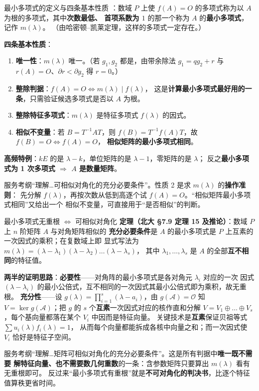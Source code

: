 \begin{fdeep}{最小多项式的定义与四条基本性质}
：数域 $P$ 上使 $f(A)=O$ 的多项式称为以 $A$ 为根的多项式，其中\textbf{次数最低、
首项系数为 $1$} 的那一个称为 $A$ 的\textbf{最小多项式}，记作 $m(\lambda)$。
（由哈密顿--凯莱定理，这样的多项式一定存在。）

\textbf{四条基本性质}：
\begin{enumerate}[leftmargin=2.2em,itemsep=0.2em]
\item \textbf{唯一性}：$m(\lambda)$ 唯一。（若 $g_1,g_2$ 都是，由带余除法 $g_1=qg_2+r$ 与
      $r(A)=O$、$\partial r<\partial g_2$ 得 $r=0$。）
\item \textbf{整除判据}：$f(A)=O\iff m(\lambda)\mid f(\lambda)$，
      这是\textbf{计算最小多项式最好用的一条}，只需验证候选多项式是否以 $A$ 为根。
\item \textbf{整除特征多项式}：$m(\lambda)$ 是特征多项式 $f(\lambda)$ 的因式。
\item \textbf{相似不变量}：若 $B=T^{-1}AT$，则 $f(B)=T^{-1}f(A)T$，故 $f(B)=O\iff f(A)=O$，
      \textbf{相似矩阵的最小多项式相同}。
\end{enumerate}
\textbf{高频特例}：$kE$ 的是 $\lambda-k$，单位矩阵的是 $\lambda-1$，零矩阵的是 $\lambda$；
反之\textbf{最小多项式为 1 次多项式 $\Rightarrow$ $A$ 是数量矩阵}。

\fbref{}服务考纲“理解…可相似对角化的充分必要条件”。性质 2 是求 $m(\lambda)$ 的\textbf{操作准则}：
先分解 $f(\lambda)$，再按次数从低到高逐个试 $f(A)=O$。“相似矩阵最小多项式相同”又给出一个
相似不变量，可直接用于“是否相似”的判断。
\end{fdeep}

\begin{fdeep}{最小多项式无重根 $\iff$ 可相似对角化}
\textbf{定理（北大 §7.9 定理 15 及推论）}：数域 $P$ 上 $n$ 阶矩阵 $A$ 与对角矩阵相似的
\textbf{充分必要条件}是 $A$ 的最小多项式是 $P$ 上互素的一次因式的乘积；在复数域上即
显式写法为 $m(\lambda)=(\lambda-\lambda_1)(\lambda-\lambda_2)\dots(\lambda-\lambda_s)$，
其中 $\lambda_1,\dots,\lambda_s$ 是 $A$ 的全部\textbf{互不相同}的特征值。

\textbf{两半的证明思路}：\textbf{必要性}——对角阵的最小多项式是各对角元 $\lambda_i$ 对应的一次
因式 $(\lambda-\lambda_i)$ 的最小公倍式，互不相同的一次因式其最小公倍式即为乘积，故无重根。
\textbf{充分性}——设 $g(\lambda)=\prod_{i=1}^{s}(\lambda-a_i)$，由 $g(\mathscr{A})=\mathscr{O}$ 知
$V=\ker g(\mathscr{A})$；把 $g$ 的 $s$ 个\textbf{互素}一次因式对应的核作直和分解
$V=V_1\oplus\dots\oplus V_s$，每个基向量都落在某个 $V_i$ 中因而是特征向量。
关键技术是\textbf{互素}保证贝祖等式 $\sum u_i(\lambda)f_i(\lambda)=1$，
从而每个向量都能拆成各核中向量之和；而一次因式使 $V_i$ 恰好是特征子空间。

\fbref{}服务考纲“理解…矩阵可相似对角化的充分必要条件”。这是所有判据中\textbf{唯一既不需要
解特征向量、也不需要数几何重数}的一条：含参数矩阵只要算出 $m(\lambda)$ 看有无重根即可。
反过来“最小多项式有重根”就是\textbf{不可对角化的判决书}，比逐个特征值算秩更省时间。
\end{fdeep}

